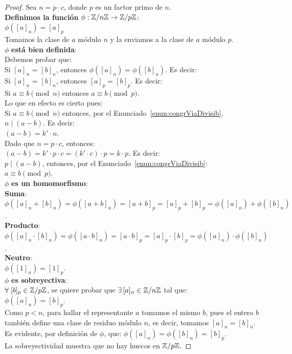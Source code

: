 \begin{proof}
Sea $n=p \cdot c$, donde $p$ es un factor primo de $n$. \\
\textbf{Definimos la función} $\phi: \mathbb{Z}/n\mathbb{Z} \to \mathbb{Z}/p\mathbb{Z}$: \\
$\phi ([a]_n) = [a]_p$ \\
Tomamos la clase de $a$ módulo $n$ y la enviamos a la clase de $a$ módulo $p$. \\
$\phi$ \textbf{está bien definida}: \\
Debemos probar que: \\
Si $[a]_n$ = $[b]_n$, entonces $\phi ([a]_n) = \phi ([b]_n)$. Es decir: \\
Si $[a]_n$ = $[b]_n$, entonces $[a]_p = [b]_p$. Es decir: \\
 Si $a \equiv b \pmod n$ entonces $a \equiv b \pmod p$. \\
 Lo que en efecto es cierto pues: \\ 
 Si $a \equiv b \pmod n$ entonces, por el Enunciado~\ref{enun:congrViaDivisib},
 $n \mid (a-b)$. Es decir: \\
 $(a-b) = k' \cdot n$. \\
 Dado que $n = p \cdot c$, entonces: \\
 $(a-b) = k' \cdot p \cdot c = (k' \cdot c) \cdot p = k \cdot p$. Es decir: \\
 $p \mid (a-b)$, entonces, por el Enunciado~\ref{enun:congrViaDivisib}: \\
 $a \equiv b \pmod p$. \\
$\phi$  \textbf{es un homomorfismo}: \\
\textbf{Suma}: \\
$\phi ([a]_n + [b]_n) = \phi ([a+b]_n) = [a+b]_p = [a]_p + [b]_p = \phi ([a]_n) + \phi ([b]_n)$. \\
\textbf{Producto}: \\
$\phi ([a]_n \cdot [b]_n) = \phi ([a\cdot b]_n) = [a \cdot b]_p = [a]_p \cdot [b]_p = \phi ([a]_n) \cdot \phi ([b]_n)$. \\
\textbf{Neutro}: \\
$\phi ([1]_n) = [1]_p$. \\
$\phi$ \textbf{es sobreyectiva}: \\
$\forall \; [b]_p \in \mathbb{Z}/p\mathbb{Z}$, se quiere probar que  $\exists \, [a]_n \in \mathbb{Z}/n\mathbb{Z}$ tal que: \\
$\phi ([a]_n) = [b]_p$. \\
Como $p < n$, para hallar el representante $a$ tomamos el mismo $b$, pues el entero $b$ también define una clase de residuo módulo $n$, es decir, tomamos $[a]_n = [b]_n$. Es evidente, por definición de $\phi$, que: $\phi ([a]_n) = \phi ([b]_n) = [b]_p$. \\
La sobreyectividad muestra que no hay huecos en $\mathbb{Z}/p\mathbb{Z}$.
\end{proof}

